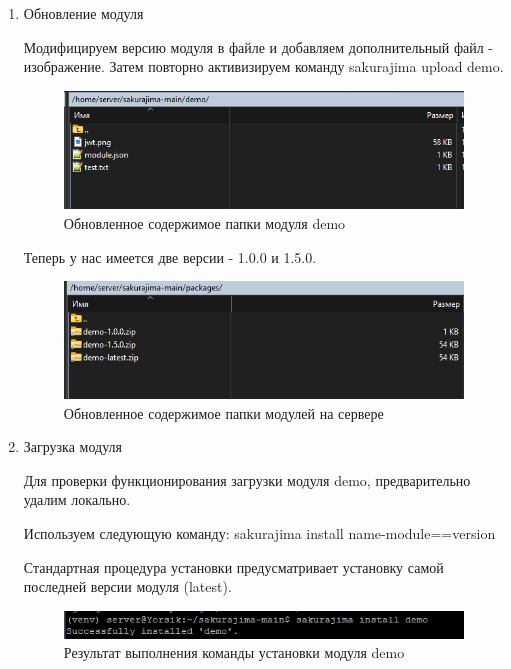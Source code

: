 \begin{enumerate}
\item Обновление модуля

Модифицируем версию модуля в файле и добавляем дополнительный файл - изображение. Затем повторно активизируем команду sakurajima upload demo.

\begin{figure}
  \centering
  \includegraphics[width=.8\textwidth]{graphics/test/demo_jwt.png}
  \caption{Обновленное содержимое папки модуля demo}
  \label{fig:test1}
\end{figure}

\newpage

Теперь у нас имеется две версии - 1.0.0 и 1.5.0.

\begin{figure}
  \centering
  \includegraphics[width=.8\textwidth]{graphics/test/demo_jwt_final.png}
  \caption{Обновленное содержимое папки модулей на сервере}
  \label{fig:test1}
\end{figure}

\item Загрузка модуля

Для проверки функционирования загрузки модуля demo, предварительно удалим локально.

Используем следующую команду: sakurajima install name-module==version

Стандартная процедура установки предусматривает установку самой последней версии модуля (latest).

\begin{figure}
  \centering
  \includegraphics[width=.8\textwidth]{graphics/test/dev_install.png}
  \caption{Результат выполнения команды установки модуля demo}
  \label{fig:test1}
\end{figure}


\end{enumerate}

